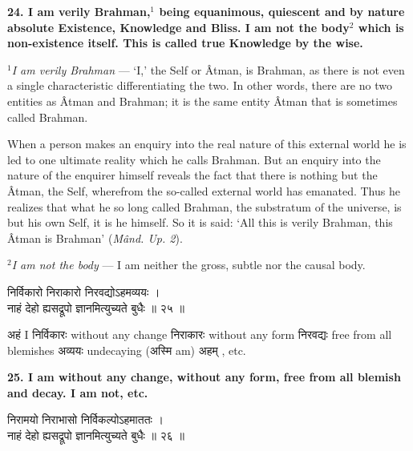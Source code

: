 \documentclass{article}
\begin{document}
{\bigskip

\textbf{24. I am verily Brahman,$^1$ being equanimous, quiescent and by nature
absolute Existence, Knowledge and Bliss. I am not the body$^2$ which is
non-existence itself. This is called true Knowledge by the wise.}

{\small \textit{$^1$I am verily Brahman} --- `I,' the Self or Âtman, is
Brahman, as there is not even a single characteristic differentiating the two.
In other words, there are no two entities as Âtman and Brahman; it is the same
entity Âtman that is sometimes called Brahman.

When a person makes an enquiry into the real nature of this external world he
is led to one ultimate reality which he calls Brahman. But an enquiry into the
nature of the enquirer himself reveals the fact that there is nothing but the
Âtman, the Self, wherefrom the so-called external world has emanated. Thus he
realizes that what he so long called Brahman, the substratum of the universe,
is but his own Self, it is he himself. So it is said: `All this is verily
Brahman, this Âtman is Brahman' (\textit{Mând. Up. 2}).

$^2$\textit{I am not the body } --- I am neither the gross, subtle nor the
causal body.
}

\begin{large}
\begin{center}
    \begin{hindi}

    निर्विकारो निराकारो निरवद्योऽहमव्ययः ।\\
    नाहं देहो ह्यसद्रूपो ज्ञानमित्युच्यते बुधैः ॥ २५ ॥

    \end{hindi}
\end{center}
\end{large}

\texthindi{अहं}
I
\texthindi{निर्विकारः}
without any change
\texthindi{निराकारः}
without any form
\texthindi{निरवद्यः}
free from all blemishes
\texthindi{अव्ययः}
undecaying
(\texthindi{अस्मि}
am)
\texthindi{अहम्}
, etc.

\bigskip

\textbf{25. I am without any change, without any form, free from all blemish
and decay. I am not, etc.  }


\begin{large}
\begin{center}
    \begin{hindi}

    निरामयो निराभासो निर्विकल्पोऽहमाततः ।\\
    नाहं देहो ह्यसद्रूपो ज्ञानमित्युच्यते बुधैः ॥ २६ ॥


\end{hindi}
\end{center}
\end{large}}
\end{document}
